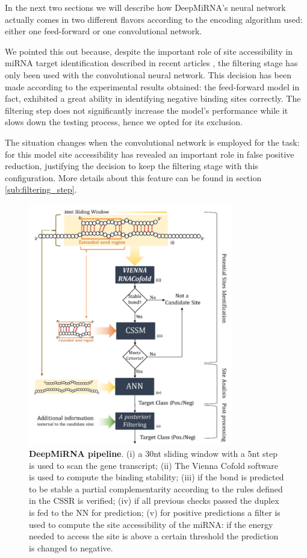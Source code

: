 In the next two sections we will describe how DeepMiRNA's neural network actually comes in two different flavors according to the encoding algorithm used: either one feed-forward or one convolutional network.
 
We pointed this out because, despite the important role of site accessibility in miRNA target identification described in recent articles \cite{accessibility_nrg_role} \cite{common_features}, the filtering stage has only been used with the convolutional neural network. This decision has been made according to the experimental results obtained: the feed-forward model in fact, exhibited a great ability in identifying negative binding sites correctly. The filtering step does not significantly increase the model's performance while it slows down the testing process, hence we opted for its exclusion.

The situation changes when the convolutional network is employed for the task: for this model site accessibility has revealed an important role in false positive reduction, justifying the decision to keep the filtering stage with this configuration. More details about this feature can be found in section \ref{sub:filtering_step}.    

\begin{figure}[hbt!]
	\centering
	\includegraphics[width=0.8\textwidth]{Figures/pipeline}
	\caption{\textbf{DeepMiRNA pipeline}. (i) a 30nt sliding window with a 5nt step is used to scan the gene transcript; (ii) The Vienna Cofold software is used to compute the binding stability; (iii) if the bond is predicted to be stable a partial complementarity according to the rules defined in the CSSR is verified; (iv) if all previous checks passed the duplex is fed to the NN for prediction; (v) for positive predictions a filter is used to compute the site accessibility of the miRNA: if the energy needed to access the site is above a certain threshold the prediction is changed to negative.}
	\label{fig:pipeline}
\end{figure}

